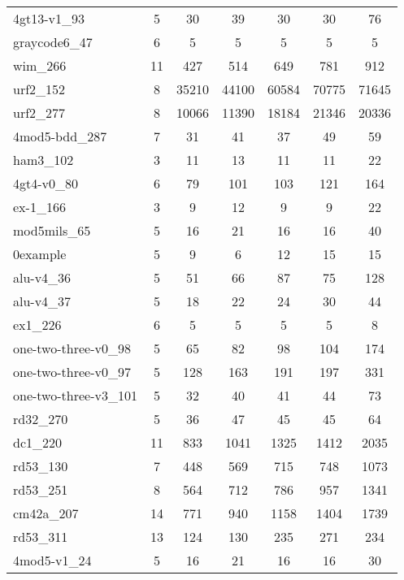 \documentclass[journal]{IEEEtran}
\begin{document}
\begin{table*}[htbp]
\begin{center}
\begin{tabular}{|p{4.3cm}<{\centering}|c|c|c|c|c|c|}
                        4gt13-v1\_93 & 5 & 30 & 39 & 30 & 30 & 76 \\ 
                        graycode6\_47 & 6 & 5 & 5 & 5 & 5 & 5 \\ 
                        wim\_266 & 11 & 427 & 514 & 649 & 781 & 912 \\ 
                        urf2\_152 & 8 & 35210 & 44100 & 60584 & 70775 & 71645 \\ 
                        urf2\_277 & 8 & 10066 & 11390 & 18184 & 21346 & 20336 \\ 
                        4mod5-bdd\_287 & 7 & 31 & 41 & 37 & 49 & 59 \\ 
                        ham3\_102 & 3 & 11 & 13 & 11 & 11 & 22 \\ 
                        4gt4-v0\_80 & 6 & 79 & 101 & 103 & 121 & 164 \\ 
                        ex-1\_166 & 3 & 9 & 12 & 9 & 9 & 22 \\ 
                        mod5mils\_65 & 5 & 16 & 21 & 16 & 16 & 40 \\ 
                        0example & 5 & 9 & 6 & 12 & 15 & 15 \\ 
                        alu-v4\_36 & 5 & 51 & 66 & 87 & 75 & 128 \\ 
                        alu-v4\_37 & 5 & 18 & 22 & 24 & 30 & 44 \\ 
                        ex1\_226 & 6 & 5 & 5 & 5 & 5 & 8 \\ 
                        one-two-three-v0\_98 & 5 & 65 & 82 & 98 & 104 & 174 \\ 
                        one-two-three-v0\_97 & 5 & 128 & 163 & 191 & 197 & 331 \\ 
                        one-two-three-v3\_101 & 5 & 32 & 40 & 41 & 44 & 73 \\ 
                        rd32\_270 & 5 & 36 & 47 & 45 & 45 & 64 \\
                        dc1\_220 & 11 & 833 & 1041 & 1325 & 1412 & 2035 \\ 
                        rd53\_130 & 7 & 448 & 569 & 715 & 748 & 1073 \\ 
                        rd53\_251 & 8 & 564 & 712 & 786 & 957 & 1341 \\ 
                        cm42a\_207 & 14 & 771 & 940 & 1158 & 1404 & 1739 \\ 
                        rd53\_311 & 13 & 124 & 130 & 235 & 271 & 234 \\ 
                        4mod5-v1\_24 & 5 & 16 & 21 & 16 & 16 & 30 \\ 

\end{tabular}
\end{center}
\end{table*}
\end{document}
